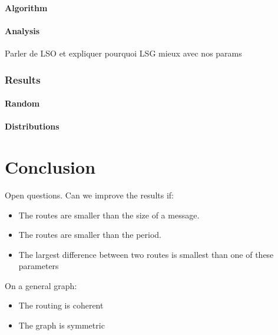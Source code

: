 \documentclass[a4paper,10pt]{article}
\begin{document}
	\paragraph{Algorithm}
	\paragraph{Analysis}
	  Parler de LSO et expliquer pourquoi LSG mieux avec nos params
     \subsubsection{Results}
	 \paragraph{Random}
	 \paragraph{Distributions}
   
\section{Conclusion}


Open questions. Can we improve the results if:
\begin{itemize}
 \item The routes are smaller than the size of a message. 
\item The routes are smaller than the period.
\item The largest difference between two routes is smallest than one of these parameters
\end{itemize}

 On a general graph:
 
\begin{itemize}
\item The routing is coherent
 \item The graph is symmetric
\end{itemize}




\end{document}
